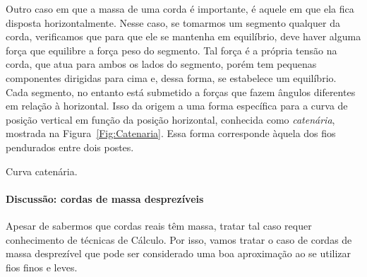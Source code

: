 Outro caso em que a massa de uma corda é importante, é aquele em que ela fica disposta horizontalmente. Nesse caso, se tomarmos um segmento qualquer da corda, verificamos que para que ele se mantenha em equilíbrio, deve haver alguma força que equilibre a força peso do segmento. Tal força é a própria tensão na corda, que atua para ambos os lados do segmento, porém tem pequenas componentes dirigidas para cima e, dessa forma, se estabelece um equilíbrio. Cada segmento, no entanto está submetido a forças que fazem ângulos diferentes em relação à horizontal. Isso da origem a uma forma específica para a curva de posição vertical em função da posição horizontal, conhecida como \emph{catenária}, mostrada na Figura~\ref{Fig:Catenaria}. Essa forma corresponde àquela dos fios pendurados entre dois postes.

\begin{marginfigure}
\centering
{}
\caption{Curva catenária.\label{Fig:Catenaria}}
\end{marginfigure}

\paragraph{Discussão: cordas de massa desprezíveis}

Apesar de sabermos que cordas reais têm massa, tratar tal caso requer conhecimento de técnicas de Cálculo. Por isso, vamos tratar o caso de cordas de massa desprezível que pode ser considerado uma boa aproximação ao se utilizar fios finos e leves.

